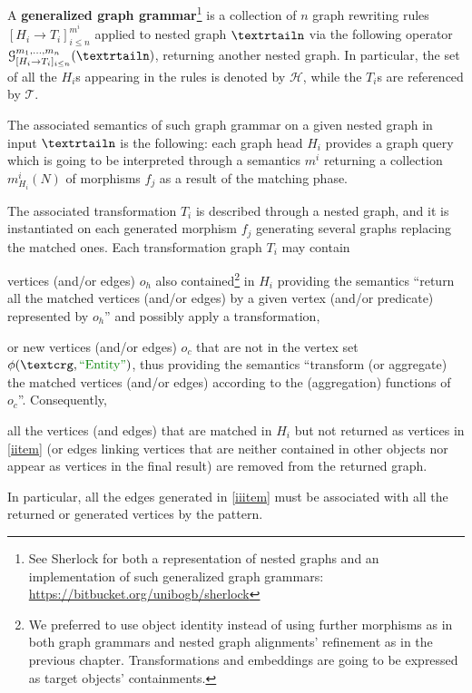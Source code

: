 \begin{definition}\label{def:gggintro}
A \textbf{generalized graph grammar}\footnote{See Sherlock for both a representation of nested graphs and an implementation of such generalized graph grammars: \url{https://bitbucket.org/unibogb/sherlock}} is a collection of $n$ graph rewriting rules $[H_i\to T_i]_{i\leq n}^{m^i}$ applied to nested graph $\nested$ via the following operator $\mathcal{G}^{m_1,\dots,m_n}_{[H_i\to T_i]_{i\leq n}}(\nested)$, returning another nested graph. In particular, the set of all the $H_i$s appearing in the rules is denoted by $\mathcal{H}$, while the $T_i$s are referenced by $\mathcal{T}$.

The associated semantics of such graph grammar on a given nested graph in input $\nested$ is the following: each graph head $H_i$ provides a graph query which is going to be interpreted through a semantics $m^i$ returning a collection $m^i_{H_i}(N)$ of morphisms $f_j$ as a result of the matching phase. 

The associated transformation $T_i$ is described through a nested graph, and it is instantiated on each generated morphism $f_j$ generating several graphs replacing the matched ones. Each transformation graph $T_i$ may contain \begin{mylist}
\item \label{iitem} vertices (and/or edges) $o_h$ also contained\footnote{We preferred to use object identity instead of using further morphisms as in both graph grammars and nested graph alignments' refinement as in the previous chapter. Transformations and embeddings are going to be expressed as target objects' containments.} in $H_i$  providing the semantics ``return all the matched vertices (and/or edges) by a given vertex (and/or predicate) represented by $o_h$'' and possibly apply a transformation,
\item \label{iiitem} or new vertices (and/or edges) $o_c$ that are not in the vertex set $\phi(\ngraph,\ONTA)$, thus providing the semantics ``transform (or aggregate) the matched vertices (and/or edges) according to the (aggregation) functions of $o_c$''. Consequently,
\item \label{iiiitem} all the vertices (and edges) that are matched in $H_i$ but not returned as vertices in \ref{iitem}  (or  edges linking vertices that are neither contained in other objects nor appear as vertices in the final result) are removed from the returned graph.
	\end{mylist} In particular, all the edges generated in \ref{iiitem} must be associated with all the returned or generated vertices by the pattern.
\end{definition}

